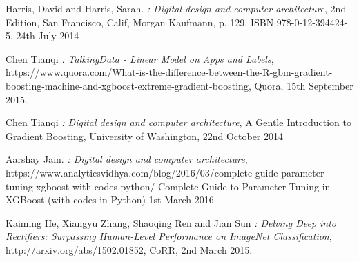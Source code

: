 \documentclass[runningheads,a4paper]{llncs}
\begin{document}
{}

\begin{thebibliography}{9}

Harris, David  and Harris, Sarah. 
\emph{: Digital design and computer architecture},  
2nd Edition,
San Francisco, Calif,
Morgan Kaufmann,
p. 129,
ISBN 978-0-12-394424-5,
24th July 2014

Chen Tianqi
\emph{: TalkingData - Linear Model on Apps and Labels},
https://www.quora.com/What-is-the-difference-between-the-R-gbm-gradient-boosting-machine-and-xgboost-extreme-gradient-boosting,
Quora,
15th September 2015.

Chen Tianqi
\emph{: Digital design and computer architecture},  
A Gentle Introduction to Gradient Boosting,
University of Washington,
22nd October 2014

Aarshay Jain. 
\emph{: Digital design and computer architecture},  
https://www.analyticsvidhya.com/blog/2016/03/complete-guide-parameter-tuning-xgboost-with-codes-python/
Complete Guide to Parameter Tuning in XGBoost (with codes in Python)
1st March 2016

Kaiming He, Xiangyu Zhang, Shaoqing Ren and Jian Sun
\emph{: Delving Deep into Rectifiers: Surpassing Human-Level Performance on ImageNet Classification},
http://arxiv.org/abs/1502.01852,
CoRR,
2nd March 2015.  

\end{thebibliography}
\end{document}
